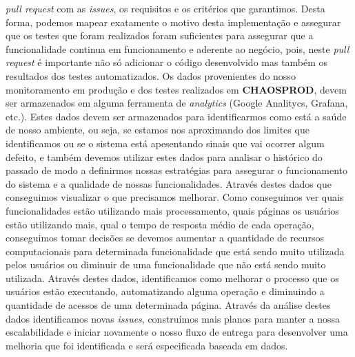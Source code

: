       \textit{pull request} com as \textit{issues}, os requisitos e os critérios
      que garantimos. Desta forma, podemos mapear exatamente o motivo desta
      implementação e assegurar que os testes que foram realizados foram suficientes
      para assegurar que a funcionalidade continua em funcionamento e aderente ao
      negócio, pois, neste \textit{pull request} é importante não só adicionar o
      código desenvolvido mas também os resultados dos testes automatizados. \newline
      Os dados provenientes do nosso monitoramento em produção e dos testes
      realizados em \textbf{CHAOSPROD}, devem ser armazenados em alguma ferramenta
      de \textit{analytics} (Google Analitycs, Grafana, etc.). Estes dados
      devem ser armazenados para identificarmos como está a saúde de nosso
      ambiente, ou seja, se estamos nos aproximando dos limites que identificamos
      ou se o sistema está apesentando sinais que vai ocorrer algum defeito, e
      também devemos utilizar estes dados para analisar o histórico do passado
      de modo a definirmos nossas estratégias para assegurar o funcionamento do
      sistema e a qualidade de nossas funcionalidades. Através destes dados
      que conseguimos visualizar o que precisamos melhorar. Como conseguimos ver
      quais funcionalidades estão utilizando mais processamento, quais páginas os
      usuários estão utilizando mais, qual o tempo de resposta médio de cada operação,
      conseguimos tomar decisões se devemos aumentar a quantidade de recursos
      computacionais para determinada funcionalidade que está sendo muito utilizada
      pelos usuários ou diminuir de uma funcionalidade que não está sendo muito
      utilizada. Através destes dados, identificamos como melhorar o processo que
      os usuários estão executando, automatizando alguma operação e diminuindo a
      quantidade de acessos de uma determinada página. Através da análise destes dados
      identificamos novas \textit{issues}, construímos mais planos para manter
      a nossa escalabilidade e iniciar novamente o nosso fluxo de entrega para
      desenvolver uma melhoria que foi identificada e será especificada baseada
      em dados.

